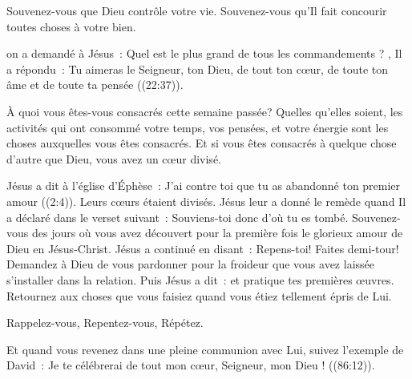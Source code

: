 Souvenez-vous que Dieu contrôle votre vie.
 Souvenez-vous qu'Il fait concourir toutes choses à votre bien. 

\dvrule






 on a demandé à Jésus~:
 \og Quel est le plus grand de tous les commandements ? \fg{},
 Il a répondu~: 
 \og Tu aimeras le Seigneur, ton Dieu, de tout ton cœur,
 de toute ton âme et de toute ta pensée \fg{} ((22:37)). 

\`A quoi vous êtes-vous consacrés cette semaine passée?
 Quelles qu'elles soient, les activités qui ont consommé votre temps,
 vos pensées, et votre énergie sont les choses auxquelles
 vous êtes consacrés. Et si vous êtes consacrés à quelque chose
 d'autre que Dieu, vous avez un cœur divisé. 


Jésus a dit à l'église d'Éphèse~:
 \og J'ai contre toi que tu as abandonné ton premier amour \fg{}
 ((2:4)).
 Leurs cœurs étaient divisés. Jésus leur a donné le remède quand
 Il a déclaré dans le verset suivant~:
 \og Souviens-toi donc d'où tu es tombé. \fg{}
 Souvenez-vous des jours où vous avez découvert pour la première fois
 le glorieux amour de Dieu en Jésus-Christ.
 Jésus a continué en disant~: \og Repens-toi! \fg{} Faites demi-tour!
 Demandez à Dieu de vous pardonner pour la froideur que vous avez laissée
 s'installer dans la relation. Puis Jésus a dit~:
 \og et pratique tes premières œuvres. \fg{}
 Retournez aux choses que vous faisiez quand vous étiez tellement épris de Lui. 

Rappelez-vous, Repentez-vous, Répétez. 

Et quand vous revenez dans une pleine communion avec Lui,
 suivez l'exemple de David~:
 \og Je te célébrerai de tout mon cœur, Seigneur, mon Dieu ! \fg{}
 ((86:12)).

